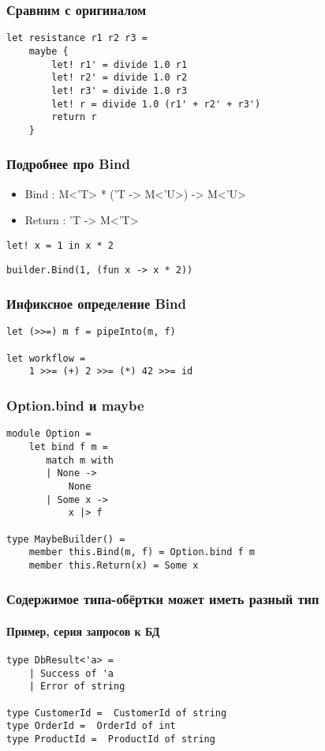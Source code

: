 \documentclass[xetex,mathserif,serif]{beamer}
\begin{document}
	\begin{frame}[fragile]
		\frametitle{Сравним с оригиналом}
		\begin{verbatim}
let resistance r1 r2 r3 = 
    maybe {
        let! r1' = divide 1.0 r1
        let! r2' = divide 1.0 r2
        let! r3' = divide 1.0 r3
        let! r = divide 1.0 (r1' + r2' + r3')
        return r
    }
		\end{verbatim}
	\end{frame}

	\begin{frame}[fragile]
		\frametitle{Подробнее про Bind}
		\begin{itemize}
			\item Bind : M<'T> * ('T -> M<'U>) -> M<'U>
			\item Return : 'T -> M<'T>
		\end{itemize}
		\begin{verbatim}
let! x = 1 in x * 2
		\end{verbatim}
		\begin{verbatim}
builder.Bind(1, (fun x -> x * 2))
		\end{verbatim}
	\end{frame}

	\begin{frame}[fragile]
		\frametitle{Инфиксное определение Bind}
		\begin{verbatim}
let (>>=) m f = pipeInto(m, f)

let workflow = 
    1 >>= (+) 2 >>= (*) 42 >>= id
		\end{verbatim}
	\end{frame}

	\begin{frame}[fragile]
		\frametitle{Option.bind и maybe}
		\begin{verbatim}
module Option = 
    let bind f m =
       match m with
       | None -> 
           None
       | Some x -> 
           x |> f 

type MaybeBuilder() =
    member this.Bind(m, f) = Option.bind f m
    member this.Return(x) = Some x
		\end{verbatim}
	\end{frame}

	\begin{frame}[fragile]
		\frametitle{Содержимое типа-обёртки может иметь разный тип}
		\framesubtitle{Пример, серия запросов к БД}
		\begin{verbatim}
type DbResult<'a> = 
    | Success of 'a
    | Error of string

type CustomerId =  CustomerId of string
type OrderId =  OrderId of int
type ProductId =  ProductId of string
		\end{verbatim}
	\end{frame}
\end{document}
